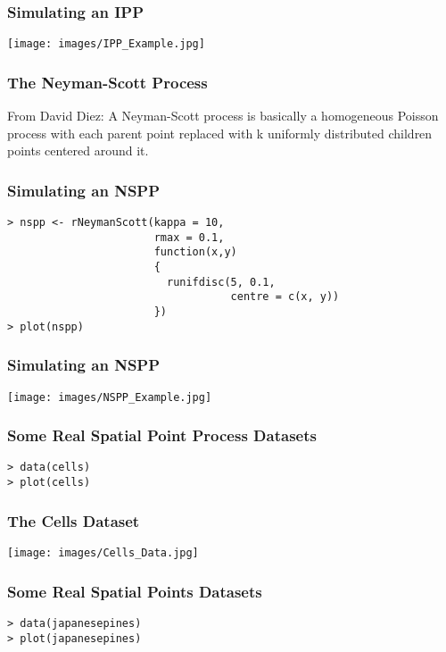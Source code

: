 \documentclass{beamer}
\begin{document}
\frame
{
	\frametitle{Simulating an IPP}

	\begin{center}
		\texttt{[image: images/IPP\_Example.jpg]}
	\end{center}
}

\begin{frame}[fragile]
	\frametitle{The Neyman-Scott Process}
	
	From David Diez: A Neyman-Scott process is basically a homogeneous Poisson process with each parent point replaced with k uniformly distributed children points centered around it.
\end{frame}

\begin{frame}[fragile]
	\frametitle{Simulating an NSPP}

	\begin{verbatim}
> nspp <- rNeymanScott(kappa = 10,
                       rmax = 0.1,
                       function(x,y)
                       {
                         runifdisc(5, 0.1,
                                   centre = c(x, y))
                       })
> plot(nspp)
	\end{verbatim}
\end{frame}


\frame
{
	\frametitle{Simulating an NSPP}

	\begin{center}
		\texttt{[image: images/NSPP\_Example.jpg]}
	\end{center}
}

\begin{frame}[fragile]
	\frametitle{Some Real Spatial Point Process Datasets}
	\begin{verbatim}
> data(cells)
> plot(cells)
	\end{verbatim}
\end{frame}

\begin{frame}[fragile]
	\frametitle{The Cells Dataset}

	\begin{center}
		\texttt{[image: images/Cells\_Data.jpg]}
	\end{center}
\end{frame}

\begin{frame}[fragile]
	\frametitle{Some Real Spatial Points Datasets}
	\begin{verbatim}
> data(japanesepines)
> plot(japanesepines)
	\end{verbatim}
\end{frame}
\end{document}
